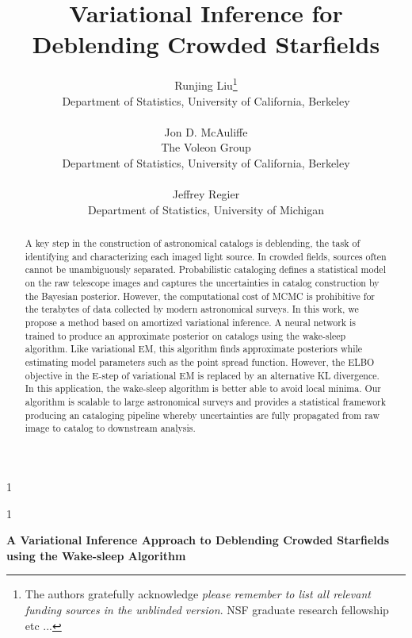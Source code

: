 \documentclass[12pt]{article}
\newcommand{\blind}{1}
\begin{document}
%

\def\spacingset#1{\renewcommand{\baselinestretch}%
{#1}\small\normalsize} \spacingset{1}


\blind
{
  \title{\bf Variational Inference for Deblending Crowded Starfields}
  \author{Runjing Liu\thanks{
    The authors gratefully acknowledge \textit{please remember to list all relevant funding sources in the unblinded version}. NSF graduate research fellowship etc ... }\hspace{.2cm}\\
    Department of Statistics, University of California, Berkeley\\
    \\
    Jon D. McAuliffe \\
    The Voleon Group \\
    Department of Statistics, University of California, Berkeley\\
    \\
    Jeffrey Regier \\
    Department of Statistics, University of Michigan
    }
  \maketitle
} \fi

\blind
{
  \bigskip
  \bigskip
  \bigskip
  \begin{center}
    {\LARGE\bf A Variational Inference Approach to Deblending Crowded Starfields using the Wake-sleep Algorithm}
\end{center}
  \medskip
} \fi

\bigskip
\begin{abstract}
A key step in the construction of astronomical catalogs is deblending, the task of identifying and characterizing each imaged light source.
In crowded fields, sources often cannot be unambiguously separated. 
Probabilistic cataloging defines a statistical model
on the raw telescope images and captures the uncertainties in catalog construction by the Bayesian posterior.
However, the computational cost of MCMC is prohibitive for the terabytes of data collected by modern astronomical surveys. 
In this work, we propose a method based on amortized variational inference.
A neural network is trained to produce an approximate posterior on catalogs using the wake-sleep algorithm. 
Like variational EM, this algorithm finds approximate posteriors while estimating model parameters such as the point spread function. 
However, the ELBO objective in the E-step of variational EM is replaced by an alternative KL divergence.
In this application, the wake-sleep algorithm is better able to avoid local minima. 
Our algorithm is scalable to large astronomical surveys and provides a statistical framework producing an cataloging pipeline whereby uncertainties are fully propagated from raw image to catalog to downstream analysis. 

\end{abstract}
\end{document}
